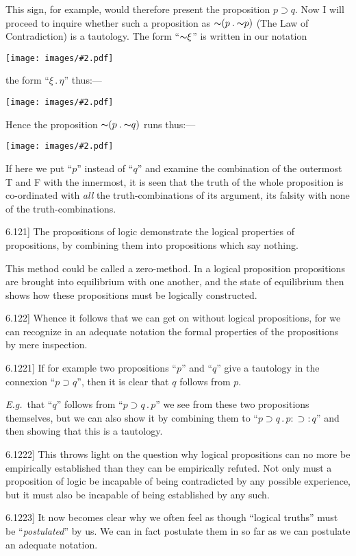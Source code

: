 \documentclass[12pt,oneside]{book}[2007/10/19]
\newcommand{\PropositionE}[2]{%
  \item[\phantomsection\label{PropE:#1}\PropGRef{#1}] #2%
}
\newcommand{\PropGRef}[1]{\hyperref[PropG:#1]{#1}}
\newcommand{\Illustration}[2][0.3\textwidth]{%
  \begin{center}
  \texttt{[image: images/\#2.pdf]}
  \end{center}
}
\newcommand{\Not}[1]{\mathord{\thicksim} #1}
\newcommand{\DotOp}{\mathbin{.}}
\newcommand{\Implies}{\supset}
\newcommand{\ExempliGratia}{\textit{E.g.}}
\begin{document}
\begin{propositions}
{This sign, for example, would therefore present
the proposition $p \Implies q$. Now I will proceed
to inquire whether such a proposition as $\Not{(p \DotOp \Not{p})}$
(The Law of Contradiction) is a tautology. The
form ``$\Not{\xi}$'' is written in our notation
\Illustration[0.1\textwidth]{brackets03-en}
the form ``$\xi \DotOp \eta$'' thus:---
\enlargethispage{-29pt} %
\Illustration[0.4\textwidth]{brackets04-en}

Hence the proposition $\Not{(p \DotOp \Not{q})}$ runs thus:---
\Illustration[0.3\textwidth]{brackets05-en}

If here we put ``$p$'' instead of ``$q$'' and examine
the combination of the outermost T and F with the
innermost, it is seen that the truth of the whole
proposition is co-ordinated with \emph{all} the truth-combinations
of its argument, its falsity with none of
the truth-combinations.}


\PropositionE{6.121}
{The propositions of logic demonstrate the logical
properties of propositions, by combining them into
propositions which say nothing.

This method could be called a zero-method. In
a logical proposition propositions are brought into
equilibrium with one another, and the state of
equilibrium then shows how these propositions
must be logically constructed.}


\PropositionE{6.122}
{Whence it follows that we can get on without
logical propositions, for we can recognize in an
adequate notation the formal properties of the propositions
by mere inspection.}


\PropositionE{6.1221}
{If for example two propositions ``$p$'' and ``$q$''
give a tautology in the connexion ``$p \Implies q$'', then
it is clear that $q$ follows from $p$.

\ExempliGratia\ that ``$q$'' follows from ``$p \Implies q \DotOp p$'' we see from
these two propositions themselves, but we can also
show it by combining them to ``$p \Implies q \DotOp p : \Implies : q$'' and
then showing that this is a tautology.}


\PropositionE{6.1222}
{This throws light on the question why logical
propositions can no more be empirically established
than they can be empirically refuted. Not only
must a proposition of logic be incapable of being
contradicted by any possible experience, but it
must also be incapable of being established by any
such.}


\PropositionE{6.1223}
{It now becomes clear why we often feel as though
``logical truths'' must be ``\emph{postulated}'' by us. We
can in fact postulate them in so far as we can
postulate an adequate notation.}



\end{propositions}
\end{document}
